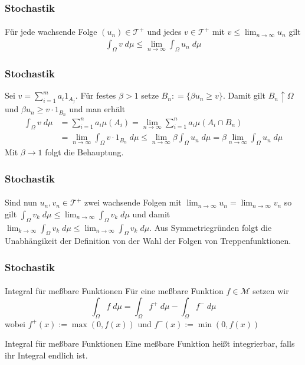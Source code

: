 \documentclass{beamer}
\begin{document}
\begin{frame}
    \frametitle{Stochastik}
\framesubtitle{}
    \begin{block}{}
        Für jede wachsende Folge $(u_n) \in \mathcal{T}^+$ und jedes $v \in \mathcal{T}^+$ mit $v \leq \lim_{n \to \infty} u_n$ gilt
        \begin{align*}
            \int_{\Omega} v \;  d \mu \leq \lim_{n \to \infty} \int_{\Omega} u_n \; d \mu  
        \end{align*}
    \end{block}

\end{frame}


\begin{frame}
    \frametitle{Stochastik}
    Sei $v = \sum_{i=1}^{m} a_i 1_{A_j}$.  
    Für festes $\beta > 1$ setze $B_n: = \{\beta u_n \geq v \}$.
    Damit gilt $B_n \uparrow \Omega$ und $\beta u_n \geq v \cdot 1_{B_n}$ und man erhält
    \begin{align*}
        \int_{\Omega} v \;  d \mu & = \sum_{i=1}^n a_i \mu (A_i) = \lim_{n \to \infty} \sum_{i=1}^n a_i \mu (A_i \cap B_n) \\
        & = \lim_{n \to \infty} \int_{\Omega} v \cdot 1_{B_n}\;  d \mu
        \leq \lim_{n \to \infty} \beta \int_{\Omega} u_n \;  d \mu = \beta \lim_{n \to \infty} \int_{\Omega} u_n \;  d \mu
    \end{align*}
    Mit $\beta \to 1$ folgt die Behauptung.
\framesubtitle{}

\end{frame}


\begin{frame}
    \frametitle{Stochastik}
\framesubtitle{}
         Sind nun $u_n, v_n \in \mathcal{T}^+$ zwei wachsende Folgen mit
          $\lim_{n \to \infty} u_n = \lim_{n \to \infty} v_n$ so gilt
          $\int_{\Omega} v_k \; d \mu \leq \lim_{n \to \infty} \int_{\Omega} v_k \; d \mu$ und damit 
          $\lim_{k \to \infty} \int_{\Omega} v_k \; d \mu  \leq \lim_{n \to \infty} \int_{\Omega} v_k \; d \mu$. 
          Aus Symmetriegründen folgt die Unabhängikeit der Definition von der Wahl der Folgen von Treppenfunktionen.
\end{frame}



\begin{frame}
    \frametitle{Stochastik}
\framesubtitle{}
    \begin{block}{Integral für meßbare Funktionen}
        Für eine meßbare Funktion  $f \in \mathcal{M}$ setzen wir
        $$ \int_{\Omega} f \; d\mu = \int_{\Omega}f^+ \; d\mu  - \int_{\Omega}f^- \; d\mu$$
        wobei $f^+(x) := \max (0, f(x))$ und $f^-(x) := \min (0, f(x))$
    \end{block}

    \begin{block}{Integral für meßbare Funktionen}
       Eine meßbare Funktion heißt integrierbar, falls ihr Integral endlich ist.
    \end{block}

\end{frame}
\end{document}
